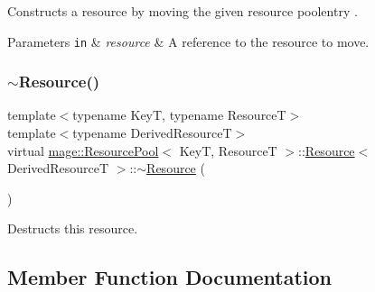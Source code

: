 Constructs a resource by moving the given resource poolentry .


\begin{DoxyParams}[1]{Parameters}
\mbox{\tt in}  & {\em resource} & A reference to the resource to move. \\
\hline
\end{DoxyParams}
\hypertarget{structmage_1_1_resource_pool_1_1_resource_a1d8bd565ab8769cedd94c1a42c6ebf46}{}\label{structmage_1_1_resource_pool_1_1_resource_a1d8bd565ab8769cedd94c1a42c6ebf46} 
\subsubsection{\texorpdfstring{$\sim$\+Resource()}{~Resource()}}
{\footnotesize\ttfamily template$<$typename KeyT, typename ResourceT$>$ \\
template$<$typename Derived\+ResourceT$>$ \\
virtual \hyperlink{classmage_1_1_resource_pool}{mage\+::\+Resource\+Pool}$<$ KeyT, ResourceT $>$\+::\hyperlink{structmage_1_1_resource_pool_1_1_resource}{Resource}$<$ Derived\+ResourceT $>$\+::$\sim$\hyperlink{structmage_1_1_resource_pool_1_1_resource}{Resource} (\begin{DoxyParamCaption}{ }\end{DoxyParamCaption})\hspace{0.3cm}{\ttfamily [virtual]}}

Destructs this resource. 

\subsection{Member Function Documentation}
\hypertarget{structmage_1_1_resource_pool_1_1_resource_a991c260c4ac0acf1761978abc704ac0d}{}\label{structmage_1_1_resource_pool_1_1_resource_a991c260c4ac0acf1761978abc704ac0d} 
